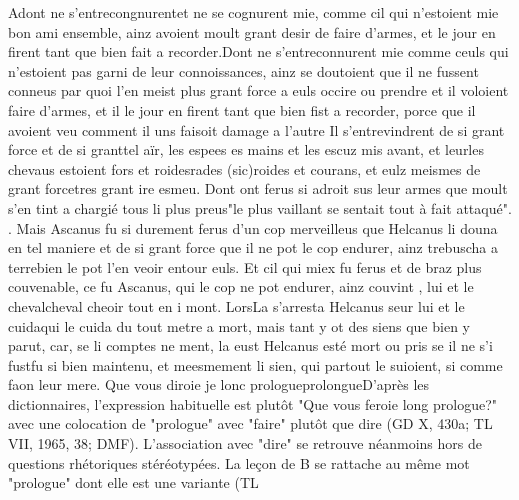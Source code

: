 \documentclass{article}
\begin{document}
\begin{pages}
                     
                        Adont ne s’entrecongnurentet ne se cognurent mie, comme cil qui n’estoient mie bon ami ensemble, ainz avoient moult
                     grant desir de faire d’armes, et le jour en firent tant que bien fait a
                     recorder.Dont ne s'entreconnurent mie comme ceuls qui n'estoient pas garni de
                     leur connoissances, ainz se doutoient que il ne fussent conneus par quoi l'en
                     meist plus grant force a euls occire ou prendre et il voloient faire d'armes,
                     et il le jour en firent tant que bien fist a recorder, porce que il avoient veu
                     comment il uns faisoit damage a l'autre Il s’entrevindrent de si grant force 
                  et de 
                        si granttel aïr, les espees es mains et les escuz mis avant, et 
                  leurles chevaus 
                  estoient fors et 
                        roidesrades (sic)roides et courans, et eulz meismes de 
                  grant forcetres grant ire esmeu. Dont ont ferus si adroit sus leur armes que 
                  moult s’en tint a chargié tous li plus preus"le plus vaillant se sentait tout à fait
                        attaqué".
                     . Mais
                        Ascanus fu si durement ferus d’un cop
                     merveilleus que Helcanus li douna en tel
                     maniere et de si grant force que il ne pot le cop endurer, ainz trebuscha a
                     terrebien le pot l'en veoir entour euls. Et cil qui miex fu ferus et de
                     braz plus couvenable, ce fu Ascanus, qui le cop ne pot endurer, ainz couvint , lui et le 
                  chevalcheval cheoir tout en i mont.
                  LorsLa s’arresta Helcanus seur lui 
                  et le cuidaqui le cuida du tout metre a mort, mais tant y ot des siens que bien y parut, car, se li comptes ne ment, la eust Helcanus esté mort ou pris se il ne s’i 
                  fustfu si bien maintenu, et meesmement li sien, qui partout le suioient, si comme
               faon leur mere. Que vous diroie je 
                     lonc 
                           prologueprolongueD'après les dictionnaires, l'expression habituelle
                     est plutôt "Que vous feroie long prologue?" avec une colocation de "prologue"
                     avec "faire" plutôt que dire (GD X, 430a; TL VII, 1965, 38; DMF). L'association
                     avec "dire" se retrouve néanmoins hors de questions rhétoriques stéréotypées.
                     La leçon de B se rattache au même mot "prologue" dont elle est une variante (TL

\end{pages}
\end{document}
